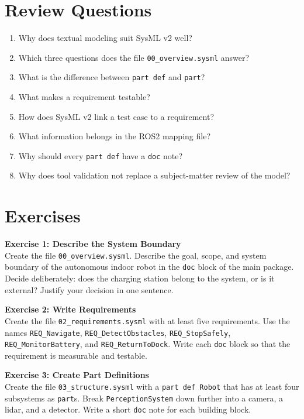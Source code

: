 \section{Review Questions}
\begin{enumerate}
    \item Why does textual modeling suit SysML v2 well?
    \item Which three questions does the file \texttt{00\_overview.sysml} answer?
    \item What is the difference between \texttt{part def} and \texttt{part}?
    \item What makes a requirement testable?
    \item How does SysML v2 link a test case to a requirement?
    \item What information belongs in the ROS2 mapping file?
    \item Why should every \texttt{part def} have a \texttt{doc} note?
    \item Why does tool validation not replace a subject-matter review of the model?
\end{enumerate}

\section{Exercises}
\begin{uebungbox}
\textbf{Exercise 1: Describe the System Boundary}\\
Create the file \texttt{00\_overview.sysml}. Describe the goal, scope, and system boundary of the autonomous indoor robot in the \texttt{doc} block of the main package. Decide deliberately: does the charging station belong to the system, or is it external? Justify your decision in one sentence.
\end{uebungbox}

\begin{uebungbox}
\textbf{Exercise 2: Write Requirements}\\
Create the file \texttt{02\_requirements.sysml} with at least five requirements. Use the names \texttt{REQ\_Navigate}, \texttt{REQ\_DetectObstacles}, \texttt{REQ\_StopSafely}, \texttt{REQ\_MonitorBattery}, and \texttt{REQ\_ReturnToDock}. Write each \texttt{doc} block so that the requirement is measurable and testable.
\end{uebungbox}

\begin{uebungbox}
\textbf{Exercise 3: Create Part Definitions}\\
Create the file \texttt{03\_structure.sysml} with a \texttt{part def Robot} that has at least four subsystems as \texttt{part}s. Break \texttt{PerceptionSystem} down further into a camera, a lidar, and a detector. Write a short \texttt{doc} note for each building block.
\end{uebungbox}


